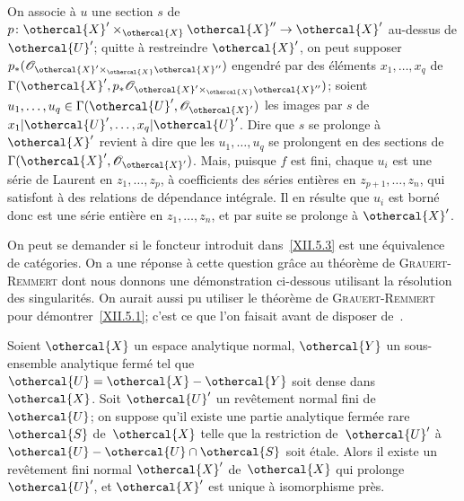On associe \`a $u$ une section $s$ de
$p\colon\othercal{X}'\times_{\othercal{X}}\othercal{X}''\to\othercal{X}'$ au-dessus de
$\othercal{U}'$; quitte \`a restreindre $\othercal{X}'$, on peut supposer
$p_*(\cal{O}_{\othercal{X}'\times_{\othercal{X}}\othercal{X}''})$
engendr\'e par des \'el\'ements $x_{1},\dots,x_{q}$ de
$\Gamma(\othercal{X}',
p_*\cal{O}_{\othercal{X}'\times_{\othercal{X}}\othercal{X}''})$; soient
$u_{1},\dots,u_{q}\in\Gamma(\othercal{U}',\cal{O}_{\othercal{X}'})$ les images
par $s$ de~${x_{1}}|\othercal{U}',\dots,{x_{q}}|\othercal{U}'$. Dire
que $s$ se prolonge \`a $\othercal{X}'$ revient \`a dire que les
$u_{1},\dots,u_{q}$ se prolongent en des sections de
$\Gamma(\othercal{X}',\cal{O}_{\othercal{X}'})$. Mais, puisque $f$ est fini,
chaque $u_{i}$ est une s\'erie de Laurent en $z_{1},\dots,z_{p}$,
\`a coefficients des s\'eries enti\`eres en
$z_{p{+}1},\dots,z_{n}$, qui satisfont \`a des relations de
d\'ependance int\'egrale. Il en r\'esulte que $u_{i}$ est
born\'e donc est une s\'erie enti\`ere en $z_{1},\dots,z_{n}$,
et par suite se prolonge \`a $\othercal{X}'$.

On peut se demander si le foncteur introduit dans~\ref{XII.5.3} est
une \'equivalence de cat\'egories. On a une r\'eponse \`a
cette question gr\^ace au th\'eor\`eme de \textsc{Grauert}-\textsc{Remmert} \cite{XII.6}
dont nous donnons une d\'emonstration ci-dessous utilisant la
r\'esolution des singularit\'es. On aurait aussi pu utiliser le
th\'eor\`eme de \textsc{Grauert}-\textsc{Remmert} pour d\'emontrer~\ref{XII.5.1};
c'est ce que l'on faisait avant de disposer de~\cite{XII.8}.

\enlargethispage{.5cm}
\begin{theoreme}
\label{XII.5.4}
Soient
$\othercal{X}$ un espace analytique normal, $\othercal{Y}$ un
sous-ensemble analytique ferm\'e tel que
$\othercal{U}=\othercal{X}-\othercal{Y}$ soit dense dans~$\othercal{X}$. Soit
$\othercal{U}'$ un rev\^etement normal fini de~$\othercal{U}$; on suppose
qu'il existe une partie analytique ferm\'ee rare $\othercal{S}$
de~$\othercal{X}$ telle que la restriction de~$\othercal{U}'$ \`a
$\othercal{U}-\othercal{U}\cap\othercal{S}$ soit \'etale. Alors il existe un
rev\^etement fini normal $\othercal{X}'$ de~$\othercal{X}$ qui prolonge
$\othercal{U}'$, et $\othercal{X}'$ est unique \`a isomorphisme pr\`es.
\end{theoreme}

